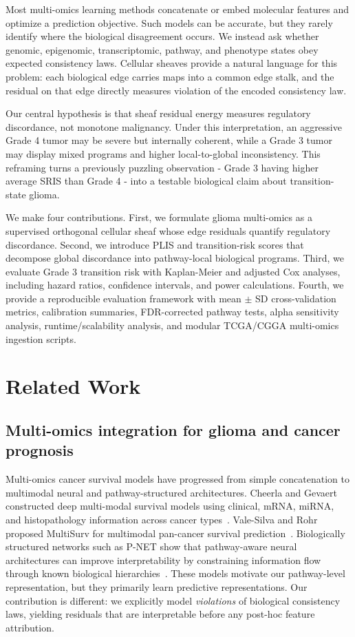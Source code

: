 \documentclass[conference]{IEEEtran}
\begin{document}
Most multi-omics learning methods concatenate or embed molecular features and optimize a prediction objective. Such models can be accurate, but they rarely identify where the biological disagreement occurs. We instead ask whether genomic, epigenomic, transcriptomic, pathway, and phenotype states obey expected consistency laws. Cellular sheaves provide a natural language for this problem: each biological edge carries maps into a common edge stalk, and the residual on that edge directly measures violation of the encoded consistency law.

Our central hypothesis is that sheaf residual energy measures regulatory discordance, not monotone malignancy. Under this interpretation, an aggressive Grade 4 tumor may be severe but internally coherent, while a Grade 3 tumor may display mixed programs and higher local-to-global inconsistency. This reframing turns a previously puzzling observation - Grade 3 having higher average SRIS than Grade 4 - into a testable biological claim about transition-state glioma.

We make four contributions. First, we formulate glioma multi-omics as a supervised orthogonal cellular sheaf whose edge residuals quantify regulatory discordance. Second, we introduce PLIS and transition-risk scores that decompose global discordance into pathway-local biological programs. Third, we evaluate Grade 3 transition risk with Kaplan-Meier and adjusted Cox analyses, including hazard ratios, confidence intervals, and power calculations. Fourth, we provide a reproducible evaluation framework with mean $\pm$ SD cross-validation metrics, calibration summaries, FDR-corrected pathway tests, alpha sensitivity analysis, runtime/scalability analysis, and modular TCGA/CGGA multi-omics ingestion scripts.

\section{Related Work}
\subsection{Multi-omics integration for glioma and cancer prognosis}
Multi-omics cancer survival models have progressed from simple concatenation to multimodal neural and pathway-structured architectures. Cheerla and Gevaert constructed deep multi-modal survival models using clinical, mRNA, miRNA, and histopathology information across cancer types~\cite{cheerla2019}. Vale-Silva and Rohr proposed MultiSurv for multimodal pan-cancer survival prediction~\cite{valesilva2021}. Biologically structured networks such as P-NET show that pathway-aware neural architectures can improve interpretability by constraining information flow through known biological hierarchies~\cite{elmarakeby2021}. These models motivate our pathway-level representation, but they primarily learn predictive representations. Our contribution is different: we explicitly model \emph{violations} of biological consistency laws, yielding residuals that are interpretable before any post-hoc feature attribution.
\end{document}
